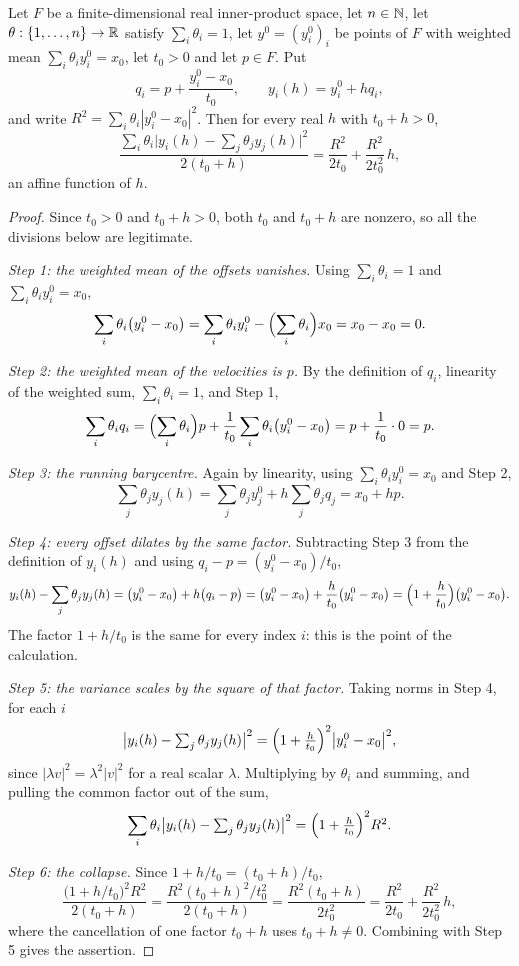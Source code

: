 \begin{lemma}
Let $F$ be a finite-dimensional real inner-product space, let $n\in\mathbb{N}$, let
$\theta:\{1,\dots,n\}\to\mathbb{R}$ satisfy $\sum_i\theta_i=1$, let $y^0=(y^0_i)_i$ be points of
$F$ with weighted mean $\sum_i\theta_iy^0_i=x_0$, let $t_0>0$ and let $p\in F$. Put
\[
  q_i=p+\frac{y^0_i-x_0}{t_0},\qquad y_i(h)=y^0_i+hq_i,
\]
and write $R^2=\sum_i\theta_i|y^0_i-x_0|^2$. Then for every real $h$ with $t_0+h>0$,
\[
  \frac{\sum_i\theta_i\bigl|y_i(h)-\sum_j\theta_jy_j(h)\bigr|^2}{2(t_0+h)}
    =\frac{R^2}{2t_0}+\frac{R^2}{2t_0^2}\,h ,
\]
an affine function of $h$.
\end{lemma}
\begin{proof}
Since $t_0>0$ and $t_0+h>0$, both $t_0$ and $t_0+h$ are nonzero, so all the divisions
below are legitimate.

\emph{Step 1: the weighted mean of the offsets vanishes.}
Using $\sum_i\theta_i=1$ and $\sum_i\theta_iy^0_i=x_0$,
\[
  \sum_i\theta_i\bigl(y^0_i-x_0\bigr)
    =\sum_i\theta_iy^0_i-\Bigl(\sum_i\theta_i\Bigr)x_0
    =x_0-x_0=0 .
\]

\emph{Step 2: the weighted mean of the velocities is $p$.}
By the definition of $q_i$, linearity of the weighted sum, $\sum_i\theta_i=1$, and
Step 1,
\[
  \sum_i\theta_iq_i
    =\Bigl(\sum_i\theta_i\Bigr)p+\frac1{t_0}\sum_i\theta_i\bigl(y^0_i-x_0\bigr)
    =p+\frac1{t_0}\cdot 0=p .
\]

\emph{Step 3: the running barycentre.}
Again by linearity, using $\sum_i\theta_iy^0_i=x_0$ and Step 2,
\[
  \sum_j\theta_jy_j(h)=\sum_j\theta_jy^0_j+h\sum_j\theta_jq_j=x_0+hp .
\]

\emph{Step 4: every offset dilates by the same factor.}
Subtracting Step 3 from the definition of $y_i(h)$ and using
$q_i-p=(y^0_i-x_0)/t_0$,
\[
  y_i(h)-\sum_j\theta_jy_j(h)
    =\bigl(y^0_i-x_0\bigr)+h\bigl(q_i-p\bigr)
    =\bigl(y^0_i-x_0\bigr)+\frac{h}{t_0}\bigl(y^0_i-x_0\bigr)
    =\Bigl(1+\frac h{t_0}\Bigr)\bigl(y^0_i-x_0\bigr).
\]
The factor $1+h/t_0$ is the same for every index $i$: this is the point of the
calculation.

\emph{Step 5: the variance scales by the square of that factor.}
Taking norms in Step 4, for each $i$
\[
  \bigl|y_i(h)-\textstyle\sum_j\theta_jy_j(h)\bigr|^2
    =\Bigl(1+\frac h{t_0}\Bigr)^2\bigl|y^0_i-x_0\bigr|^2 ,
\]
since $|\lambda v|^2=\lambda^2|v|^2$ for a real scalar $\lambda$. Multiplying by
$\theta_i$ and summing, and pulling the common factor out of the sum,
\[
  \sum_i\theta_i\bigl|y_i(h)-\textstyle\sum_j\theta_jy_j(h)\bigr|^2
    =\Bigl(1+\frac h{t_0}\Bigr)^2R^2 .
\]

\emph{Step 6: the collapse.}
Since $1+h/t_0=(t_0+h)/t_0$,
\[
  \frac{\bigl(1+h/t_0\bigr)^2R^2}{2(t_0+h)}
    =\frac{R^2(t_0+h)^2/t_0^2}{2(t_0+h)}
    =\frac{R^2(t_0+h)}{2t_0^2}
    =\frac{R^2}{2t_0}+\frac{R^2}{2t_0^2}\,h ,
\]
where the cancellation of one factor $t_0+h$ uses $t_0+h\neq0$. Combining with Step 5
gives the assertion.
\end{proof}

